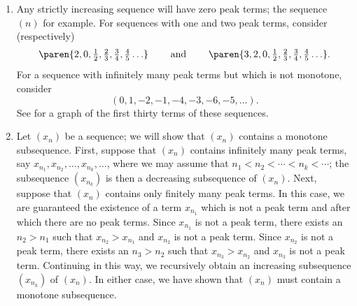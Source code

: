 \documentclass{lew98_solutions}
\begin{document}
\begin{solution}
    \begin{enumerate}
        \item Any strictly increasing sequence will have zero peak terms; the sequence \( (n) \) for example. For sequences with one and two peak terms, consider (respectively)
        \[
            \paren{ 2, 0, \tfrac{1}{2}, \tfrac{2}{3}, \tfrac{3}{4}, \tfrac{4}{5} \ldots } \hspaceand \paren{ 3, 2, 0, \tfrac{1}{2}, \tfrac{2}{3}, \tfrac{3}{4}, \tfrac{4}{5} \ldots }.
        \]
        For a sequence with infinitely many peak terms but which is not monotone, consider
        \[
            (0, 1, -2, -1, -4, -3, -6, -5, \ldots).
        \]
        See  for a graph of the first thirty terms of these sequences.

        \item Let \( (x_n) \) be a sequence; we will show that \( (x_n) \) contains a monotone subsequence. First, suppose that \( (x_n) \) contains infinitely many peak terms, say \( x_{n_1}, x_{n_2}, \ldots, x_{n_k}, \ldots \), where we may assume that \( n_1 < n_2 < \cdots < n_k < \cdots \); the subsequence \( (x_{n_k}) \) is then a decreasing subsequence of \( (x_n) \). Next, suppose that \( (x_n) \) contains only finitely many peak terms. In this case, we are guaranteed the existence of a term \( x_{n_1} \) which is not a peak term and after which there are no peak terms. Since \( x_{n_1} \) is not a peak term, there exists an \( n_2 > n_1 \) such that \( x_{n_2} > x_{n_1} \) and \( x_{n_2} \) is not a peak term. Since \( x_{n_2} \) is not a peak term, there exists an \( n_3 > n_2 \) such that \( x_{n_3} > x_{n_2} \) and \( x_{n_3} \) is not a peak term. Continuing in this way, we recursively obtain an increasing subsequence \( (x_{n_k}) \) of \( (x_n) \). In either case, we have shown that \( (x_n) \) must contain a monotone subsequence.


\end{enumerate}
\end{solution}
\end{document}
